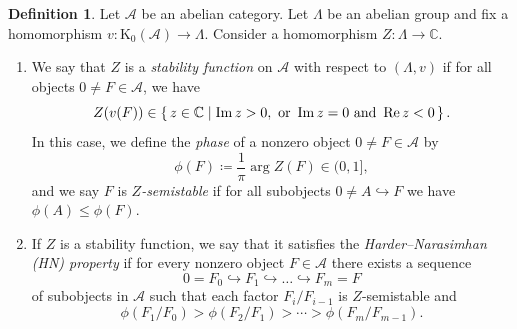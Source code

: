\documentclass[11pt, reqno]{amsart}
\numberwithin{equation}{section}
\theoremstyle{plain}
\theoremstyle{remark}
\theoremstyle{definition}
\newtheorem{definition}[theorem]{Definition}
\theoremstyle{italicsname}
\newcommand{\st}{\mid}
\newcommand{\set}[1]{\left\{ \, #1 \, \right\}}
\def\Re{\mathop{\rm Re}\nolimits}
\def\Im{\mathop{\rm Im}\nolimits}
\newcommand{\cA}{\mathscr{A}}
\newcommand{\rK}{\mathrm{K}}
\def\CC{\ensuremath{\mathbb{C}}}
\begin{document}
\begin{definition}
    Let $\cA$ be an abelian category. 
    Let $\Lambda$ be an abelian group and fix a homomorphism $v \colon \rK_0(\cA) \to \Lambda$. 
    Consider a homomorphism $Z \colon \Lambda \to \CC$. 
    \begin{enumerate}[{\rm (1)}]
        \item We say that $Z$ is a \emph{stability function} on $\cA$ with respect to $(\Lambda, v)$ if for all objects $0 \neq F \in \cA$, we have 
        \begin{equation*}
            Z(v(F)) \in \set{ z \in \CC \st \Im z > 0, \text{ or } \Im z = 0 \text{ and } \Re z < 0}. 
        \end{equation*}
        In this case, we define the \emph{phase} of a nonzero object $0 \neq F \in \cA$ by 
        \begin{equation*} 
        \phi(F) \coloneqq \frac{1}{\pi} \arg Z(F) \in (0,1],
        \end{equation*}
        and we say $F$ is \emph{$Z$-semistable} if for all subobjects $0 \neq A \hookrightarrow F$ we have $\phi(A) \leq \phi(F)$. 
        \item If $Z$ is a stability function, we say that it satisfies the \emph{Harder--Narasimhan (HN) property} if for every nonzero object $F \in \cA$ there exists a sequence
        \begin{equation*}
            0 = F_0 \hookrightarrow F_1 \hookrightarrow \dots \hookrightarrow F_m = F 
        \end{equation*}
        of subobjects in $\cA$ such that each factor $F_i/F_{i-1}$ is $Z$-semistable and 
        \begin{equation*}
        \phi(F_1/F_0) > \phi(F_2/F_1) > \cdots > \phi(F_m/F_{m-1}). 
        \end{equation*} 
    \end{enumerate}
\end{definition}
\end{document}
